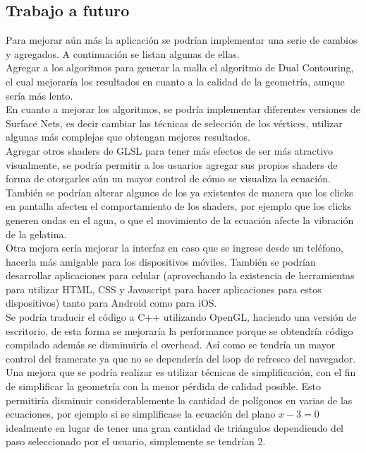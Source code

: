 \documentclass[12pt]{article}
\begin{document}
\subsection{Trabajo a futuro}
Para mejorar aún más la aplicación se podrían implementar una serie de cambios y agregados. A continuación se listan algunas de ellas.
\\Agregar a los algoritmos para generar la malla el algoritmo de Dual Contouring\cite{dualcontour}, el cual mejoraría los resultados en cuanto a la calidad de la geometría, aunque sería más lento. 
\\En cuanto a mejorar los algoritmos, se podría implementar diferentes versiones de Surface Nets, es decir cambiar las técnicas de selección de los vértices, utilizar algunas más complejas que obtengan mejores resultados.
\\Agregar otros shaders de GLSL para tener más efectos de ser más atractivo visualmente, se podría permitir a los usuarios agregar sus propios shaders de forma de otorgarles aún un mayor control de cómo se visualiza la ecuación. También se podrían alterar algunos de los ya existentes de manera que los clicks en pantalla afecten el comportamiento de los shaders, por ejemplo que los clicks generen ondas en el agua, o que el movimiento de la ecuación afecte la vibración de la gelatina.
\\Otra mejora sería mejorar la interfaz en caso que se ingrese desde un teléfono, hacerla más amigable para los dispositivos móviles.
También se podrían desarrollar aplicaciones para celular (aprovechando la existencia de herramientas para utilizar HTML, CSS y Javascript para hacer aplicaciones para estos dispositivos) tanto para Android como para iOS. 
\\Se podría traducir el código a C++ utilizando OpenGL, haciendo una versión de escritorio, de esta forma se mejoraría la performance porque se obtendría código compilado además se disminuiría el overhead. Así como se tendría un mayor control del framerate ya que no se dependería del loop de refresco del navegador.
\\Una mejora que se podría realizar es utilizar técnicas de simplificación\cite{simplificacion}\cite{realtimerendering}, con el fin de simplificar la geometría con la menor pérdida de calidad posible. Esto permitiría disminuir considerablemente la cantidad de polígonos en varias de las ecuaciones, por ejemplo si se simplificase la ecuación del plano $x-3=0$ idealmente en lugar de tener una gran cantidad de triángulos dependiendo del paso seleccionado por el usuario, simplemente se tendrían 2.
\end{document}
